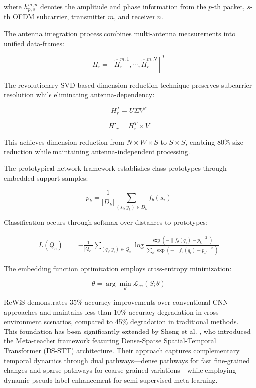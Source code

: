 \documentclass[journal]{IEEEtran}
\begin{document}
where $h^{m,n}_{p,s}$ denotes the amplitude and phase information from the $p$-th packet, $s$-th OFDM subcarrier, transmitter $m$, and receiver $n$.

The antenna integration process combines multi-antenna measurements into unified data-frames:

\begin{equation}
H_r = [\hat{H}^{m,1}_r, \cdots, \hat{H}^{m,N}_r]^T
\label{eq:rewis_integration}
\end{equation}

The revolutionary SVD-based dimension reduction technique preserves subcarrier resolution while eliminating antenna-dependency:

\begin{equation}
H_r^T = U\Sigma V^T
\label{eq:rewis_svd}
\end{equation}

\begin{equation}
H'_r = H_r^T \times V
\label{eq:rewis_compact}
\end{equation}

This achieves dimension reduction from $N \times W \times S$ to $S \times S$, enabling 80\% size reduction while maintaining antenna-independent processing.

The prototypical network framework establishes class prototypes through embedded support samples:

\begin{equation}
p_k = \frac{1}{|D_k|} \sum_{(s_i,y_k) \in D_k} f_\theta(s_i)
\label{eq:rewis_prototype}
\end{equation}

Classification occurs through softmax over distances to prototypes:

\begin{align}
L(Q_e) &= -\frac{1}{|Q_e|} \sum_{(q_i,y_i) \in Q_e} \log \frac{\exp(-\|f_\theta(q_i) - p_k\|^2)}{\sum_{k'} \exp(-\|f_\theta(q_i) - p_{k'}\|^2)}
\label{eq:rewis_loss}
\end{align}

The embedding function optimization employs cross-entropy minimization:

\begin{equation}
\theta = \arg\min_\theta \mathcal{L}_{ce}(S; \theta)
\label{eq:rewis_embedding}
\end{equation}

ReWiS demonstrates 35\% accuracy improvements over conventional CNN approaches and maintains less than 10\% accuracy degradation in cross-environment scenarios, compared to 45\% degradation in traditional methods. This foundation has been significantly extended by Sheng et al. \cite{sheng2024metaformer}, who introduced the Meta-teacher framework featuring Dense-Sparse Spatial-Temporal Transformer (DS-STT) architecture. Their approach captures complementary temporal dynamics through dual pathways—dense pathways for fast fine-grained changes and sparse pathways for coarse-grained variations—while employing dynamic pseudo label enhancement for semi-supervised meta-learning.
\end{document}
